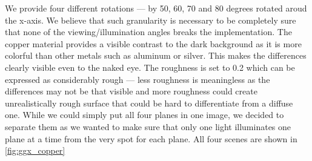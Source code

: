 We provide four different rotations --- by 50, 60, 70 and 80 degrees rotated aroud the x-axis. We believe that such granularity is necessary to be completely sure that none of the viewing/illumination angles breaks the implementation. The copper material provides a visible contrast to the dark background as it is more colorful than other metals such as aluminum or silver. This makes the differences clearly visible even to the naked eye. The roughness is set to 0.2 which can be expressed as considerably rough --- less roughness is meaningless as the differences may not be that visible and more roughness could create unrealistically rough surface that could be hard to differentiate from a diffuse one. While we could simply put all four planes in one image, we decided to separate them as we wanted to make sure that only one light illuminates one plane at a time from the very spot for each plane. All four scenes are shown in \autoref{fig:ggx_copper}

